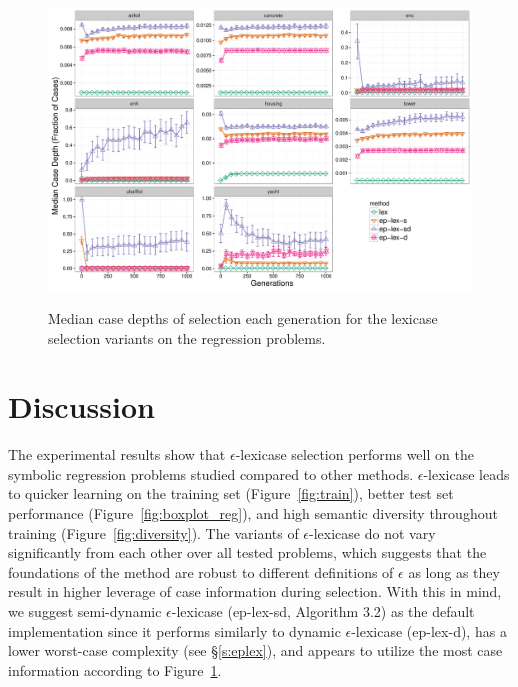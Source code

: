 \documentclass[twoside]{article}
\begin{document}
\begin{figure}
\centering
  \includegraphics[width=\textwidth]{figs/median_case_depth.pdf}\\
 \caption{Median case depths of selection each generation for the lexicase selection variants on the regression problems.}\label{fig:case_depth}
\end{figure}

\label{wilcox table}





\section{Discussion}\label{s:discuss}
The experimental results show that $\epsilon$-lexicase selection performs well on the symbolic regression problems studied compared to other methods. $\epsilon$-lexicase leads to quicker learning on the training set (Figure~\ref{fig:train}), better test set performance (Figure~\ref{fig:boxplot_reg}), and high semantic diversity throughout training (Figure~\ref{fig:diversity}). The variants of $\epsilon$-lexicase do not vary significantly from each other over all tested problems, which suggests that the foundations of the method are robust to different definitions of $\epsilon$ as long as they result in higher leverage of case information during selection. With this in mind, we suggest semi-dynamic $\epsilon$-lexicase (ep-lex-sd, Algorithm 3.2) as the default implementation since it performs similarly to dynamic $\epsilon$-lexicase (ep-lex-d), has a lower worst-case complexity (see \S\ref{s:eplex}), and appears to utilize the most case information according to Figure~\ref{fig:case_depth}. 
 
\end{document}
